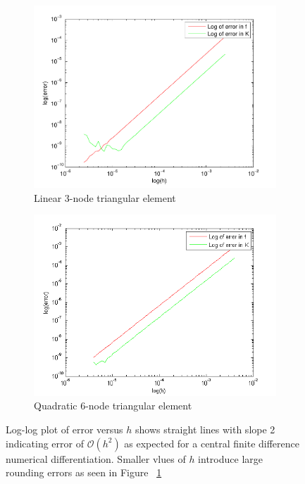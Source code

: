 \documentclass[../main.tex]{subfiles}
\begin{document}
\begin{figure}[ht]
  \centering
  \begin{subfigure}[b]{0.5\textwidth}
    \includegraphics[scale=0.5]{./img/ConsistencyT3Lin.pdf}
    \caption{Linear 3-node triangular element}
    \label{fig:linCon}
  \end{subfigure}%
  \begin{subfigure}[b]{0.5\textwidth}
    \includegraphics[scale=0.5]{./img/T6quadEleConsistency.png}
    \caption{Quadratic 6-node triangular element}
    \label{fig:quadCon}
  \end{subfigure}
  \caption{Log-log plot of error versus $h$ shows straight lines with
    slope 2 indicating error of $\mathcal{O}(h^2)$ as expected for a
    central finite difference numerical differentiation. Smaller vlues
    of $h$ introduce large rounding errors as seen in Figure
    ~\ref{fig:linCon}}
  \label{fig:consistency}
\end{figure}
\end{document}
